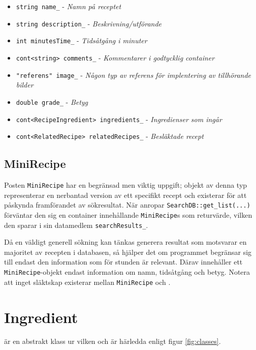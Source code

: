   \begin{itemize}
    \item \verb+string name_+ - \emph{Namn på receptet}
    \item \verb+string description_+ - \emph{Beskrivning/utförande}
    \item \verb+int minutesTime_+ - \emph{Tidsåtgång i minuter}
    \item \verb+cont<string> comments_+ - \emph{Kommentarer i godtycklig container}
    \item \verb+"referens" image_+ - \emph{Någon typ av referens för implentering av tillhörande bilder}
    \item \verb+double grade_+ - \emph{Betyg}
  \end{itemize}

  \begin{itemize}
    \item \verb+cont<RecipeIngredient> ingredients_+ - \emph{Ingredienser som ingår}
    \item \verb+cont<RelatedRecipe> relatedRecipes_+ - \emph{Besläktade recept}
  \end{itemize}

\subsection{MiniRecipe}
Posten \verb+MiniRecipe+ har en begränsad men viktig uppgift; objekt av denna typ representerar en nerbantad version av ett specifikt recept och existerar för att påskynda framförandet av sökresultat. När \Shell{} anropar \verb+SearchDB::get_list(...)+ förväntar den sig en container innehållande \verb+MiniRecipe+s som returvärde, vilken den sparar i sin datamedlem \verb+searchResults_+.

Då en väldigt generell sökning kan tänkas generera resultat som motsvarar en majoritet av recepten i databasen, så hjälper det om programmet begränsar sig till endast den information som för stunden är relevant. Därav innehåller ett \verb+MiniRecipe+-objekt endast information om namn, tidsåtgång och betyg. Notera att inget släktskap existerar mellan \verb+MiniRecipe+ och \Recipe.

\section{Ingredient}
\Ingredient{} är en abstrakt klass ur vilken \InfoIngredient{} och \RecipeIngredient{} är härledda enligt figur \ref{fig:classes}.

